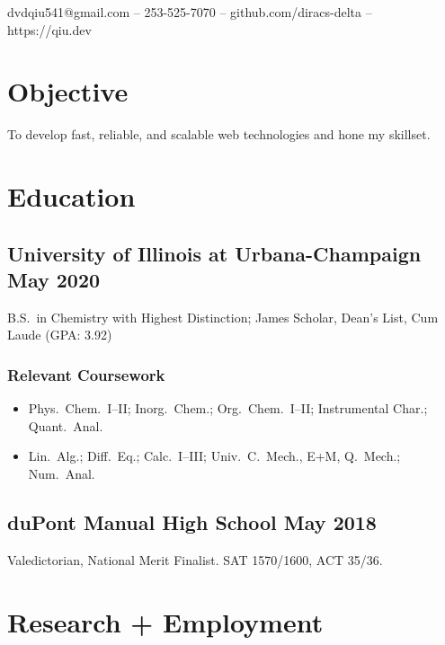 \documentclass{article}
\makeatletter
\renewcommand{\maketitle}
{
	\begin{center}
	{\huge\bfseries\theauthor}

	\vspace{0.5em}
	dvdqiu541@gmail.com -- 253-525-7070 -- github.com/diracs-delta -- https://qiu.dev
	\end{center}
}
\makeatother
\begin{document}
\author{David Qiu}
\maketitle

\section{Objective}
To develop fast, reliable, and scalable web technologies and hone my skillset.

\section{Education}

\subsection{University of Illinois at Urbana-Champaign \hfill May 2020}
B.S.\ in Chemistry with Highest Distinction; James Scholar, Dean's List, Cum Laude (GPA: 3.92)

\subsubsection{Relevant Coursework}

\begin{itemize}[noitemsep,nolistsep]
	\item Phys.\ Chem.\ I--II; Inorg.\ Chem.; Org.\ Chem.\ I--II; Instrumental
		Char.; Quant.\ Anal.

	\item Lin.\ Alg.; Diff.\ Eq.; Calc.\ I--III; Univ.\ C.\ Mech., E+M, Q.\
		Mech.; Num.\ Anal.
\end{itemize}

\subsection{duPont Manual High School \hfill May 2018}
Valedictorian, National Merit Finalist. SAT 1570/1600, ACT 35/36.


\section{Research + Employment}
\end{document}
